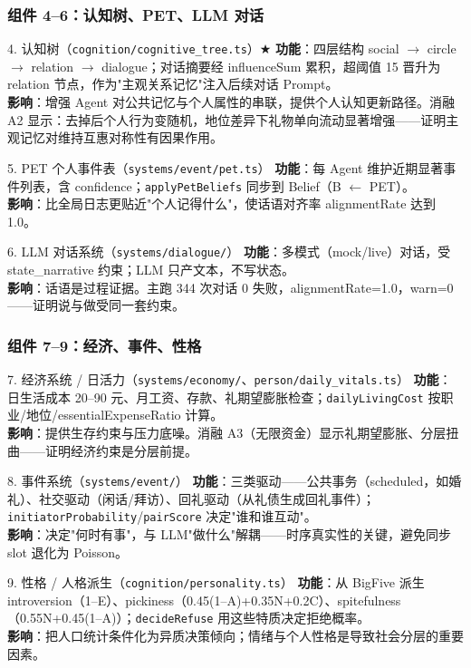 \documentclass[AutoFakeBold,AutoFakeSlant]{beamer}
\begin{document}
\begin{frame}
    \frametitle{组件 4--6：认知树、PET、LLM 对话}
    \scriptsize
    \begin{block}{4. 认知树（\texttt{cognition/cognitive\_tree.ts}）$\bigstar$}
        \textbf{功能}：四层结构 social $\to$ circle $\to$ relation $\to$ dialogue；对话摘要经 influenceSum 累积，超阈值 15 晋升为 relation 节点，作为"主观关系记忆"注入后续对话 Prompt。\\
        \textbf{影响}：增强 Agent 对公共记忆与个人属性的串联，提供个人认知更新路径。消融 A2 显示：去掉后个人行为变随机，地位差异下礼物单向流动显著增强——证明主观记忆对维持互惠对称性有因果作用。
    \end{block}
    \begin{block}{5. PET 个人事件表（\texttt{systems/event/pet.ts}）}
        \textbf{功能}：每 Agent 维护近期显著事件列表，含 confidence；\texttt{applyPetBeliefs} 同步到 Belief（B $\leftarrow$ PET）。\\
        \textbf{影响}：比全局日志更贴近"个人记得什么"，使话语对齐率 alignmentRate 达到 1.0。
    \end{block}
    \begin{block}{6. LLM 对话系统（\texttt{systems/dialogue/}）}
        \textbf{功能}：多模式（mock/live）对话，受 state\_narrative 约束；LLM 只产文本，不写状态。\\
        \textbf{影响}：话语是过程证据。主跑 344 次对话 0 失败，alignmentRate=1.0，warn=0——证明说与做受同一套约束。
    \end{block}
\end{frame}

\begin{frame}
    \frametitle{组件 7--9：经济、事件、性格}
    \scriptsize
    \begin{block}{7. 经济系统 / 日活力（\texttt{systems/economy/}、\texttt{person/daily\_vitals.ts}）}
        \textbf{功能}：日生活成本 20--90 元、月工资、存款、礼期望膨胀检查；\texttt{dailyLivingCost} 按职业/地位/essentialExpenseRatio 计算。\\
        \textbf{影响}：提供生存约束与压力底噪。消融 A3（无限资金）显示礼期望膨胀、分层扭曲——证明经济约束是分层前提。
    \end{block}
    \begin{block}{8. 事件系统（\texttt{systems/event/}）}
        \textbf{功能}：三类驱动——公共事务（scheduled，如婚礼）、社交驱动（闲话/拜访）、回礼驱动（从礼债生成回礼事件）；\texttt{initiatorProbability}/\texttt{pairScore} 决定"谁和谁互动"。\\
        \textbf{影响}：决定"何时有事"，与 LLM"做什么"解耦——时序真实性的关键，避免同步 slot 退化为 Poisson。
    \end{block}
    \begin{block}{9. 性格 / 人格派生（\texttt{cognition/personality.ts}）}
        \textbf{功能}：从 BigFive 派生 introversion（1--E）、pickiness（0.45(1--A)+0.35N+0.2C）、spitefulness（0.55N+0.45(1--A)）；\texttt{decideRefuse} 用这些特质决定拒绝概率。\\
        \textbf{影响}：把人口统计条件化为异质决策倾向；情绪与个人性格是导致社会分层的重要因素。
    \end{block}
\end{frame}
\end{document}
